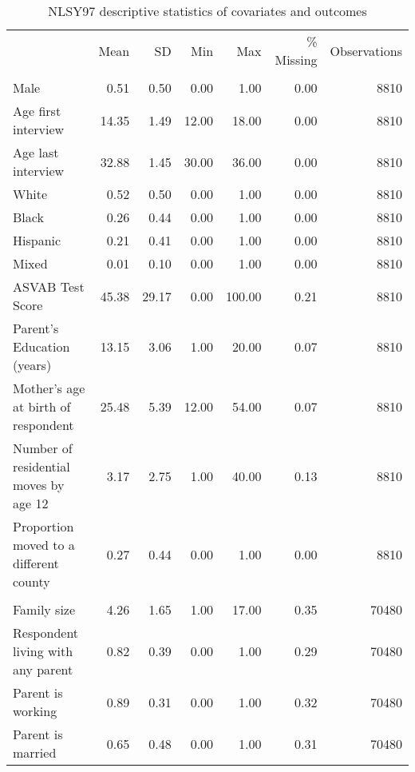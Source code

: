 \begin{table}[htp]
\scriptsize
\setlength{\tabcolsep}{10pt}
\renewcommand{\arraystretch}{0.8}
\begin{threeparttable}
\centering
\caption{NLSY97 descriptive statistics of covariates and outcomes} 
\label{tab:nlsy97_descriptives}
\begin{tabular}{lrrrrrr}
  \hline
\addlinespace
& Mean & SD & Min & Max & \% Missing & Observations \\ 
\addlinespace
 \hline
  \addlinespace
\multicolumn{7}{l}{\textit{Time-invariant covariates}} \\
\addlinespace
\quad Male & 0.51 & 0.50 & 0.00 & 1.00 & 0.00 & 8810 \\ 
  \quad Age first interview & 14.35 & 1.49 & 12.00 & 18.00 & 0.00 & 8810 \\ 
  \quad Age last interview & 32.88 & 1.45 & 30.00 & 36.00 & 0.00 & 8810 \\ 
  \quad White & 0.52 & 0.50 & 0.00 & 1.00 & 0.00 & 8810 \\ 
  \quad Black & 0.26 & 0.44 & 0.00 & 1.00 & 0.00 & 8810 \\ 
  \quad Hispanic & 0.21 & 0.41 & 0.00 & 1.00 & 0.00 & 8810 \\ 
  \quad Mixed & 0.01 & 0.10 & 0.00 & 1.00 & 0.00 & 8810 \\ 
  \quad ASVAB Test Score & 45.38 & 29.17 & 0.00 & 100.00 & 0.21 & 8810 \\ 
  \quad Parent's Education (years) & 13.15 & 3.06 & 1.00 & 20.00 & 0.07 & 8810 \\ 
  \quad Mother's age at birth of respondent & 25.48 & 5.39 & 12.00 & 54.00 & 0.07 & 8810 \\ 
  \quad Number of residential moves by age 12 & 3.17 & 2.75 & 1.00 & 40.00 & 0.13 & 8810 \\ 
  \quad Proportion moved to a different county & 0.27 & 0.44 & 0.00 & 1.00 & 0.00 & 8810 \\ 
   \addlinespace
\multicolumn{7}{l}{\textit{Time-variant covariates}} \\
\addlinespace
\quad Family size & 4.26 & 1.65 & 1.00 & 17.00 & 0.35 & 70480 \\ 
  \quad Respondent living with any parent & 0.82 & 0.39 & 0.00 & 1.00 & 0.29 & 70480 \\ 
  \quad Parent is working & 0.89 & 0.31 & 0.00 & 1.00 & 0.32 & 70480 \\ 
  \quad Parent is married & 0.65 & 0.48 & 0.00 & 1.00 & 0.31 & 70480 \\ 

\end{tabular}
\end{threeparttable}
\end{table}
